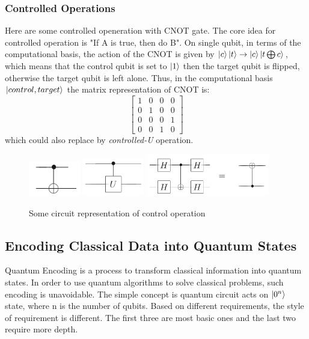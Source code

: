 \documentclass{article}
\begin{document}
\subsubsection*{Controlled Operations}
Here are some controlled openeration with CNOT gate. The core 
idea for controlled operation is "If A is true, then do B". On 
single qubit, in terms of the computational basis, the action
of the CNOT is given by $\ket{c} \ket{t} \rightarrow \ket{c} \ket{t \bigoplus c }$,
which means that the control qubit is set to $\ket{1}$ then the target
qubit is flipped, otherwise the target qubit is left alone. Thus, 
in the computational basis $\ket{control, target}$ the matrix representation
of CNOT is: 
\begin{equation}
  \begin{bmatrix}
    1 & 0 & 0 & 0 \\
    0 & 1 & 0 & 0 \\
    0 & 0 & 0 & 1 \\
    0 & 0 & 1 & 0 
  \end{bmatrix}
\end{equation}
which could also replace by \textit{controlled-U} operation. 
\begin{figure}[h]
  \includegraphics[width=0.20\textwidth]{cnot.png}
  \includegraphics[width=0.24\textwidth]{cnot-u.png}
  \includegraphics[width=0.48\textwidth]{cnot-h.png}
  \caption{Some circuit representation of control operation}
\end{figure}
\subsection*{Encoding Classical Data into Quantum States}
Quantum Encoding is a process to transform classical information into quantum 
states. In order to use quantum algorithms to solve classical problems, 
such encoding is unavoidable. The simple concept is quantum circuit acts on 
$\ket{0^n}$ state, where n is the number of qubits. Based on different 
requirements, the style of requirement is different. The first three are 
most basic ones and the last two require more depth. 
\end{document}
